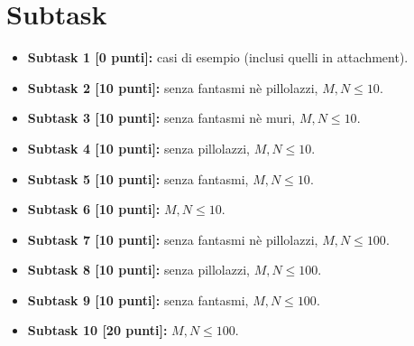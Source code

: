 \section*{Subtask}
\begin{itemize}
\item \textbf{Subtask 1 [0 punti]:} casi di esempio (inclusi quelli in attachment).
\item \textbf{Subtask 2 [10 punti]:} senza fantasmi nè pillolazzi, $M,N \le 10$.
\item \textbf{Subtask 3 [10 punti]:} senza fantasmi nè muri, $M,N \le 10$.
\item \textbf{Subtask 4 [10 punti]:} senza pillolazzi, $M,N \le 10$.
\item \textbf{Subtask 5 [10 punti]:} senza fantasmi, $M,N \le 10$.
\item \textbf{Subtask 6 [10 punti]:} $M,N \le 10$.
\item \textbf{Subtask 7 [10 punti]:} senza fantasmi nè pillolazzi, $M,N \le 100$.
\item \textbf{Subtask 8 [10 punti]:} senza pillolazzi, $M,N \le 100$.
\item \textbf{Subtask 9 [10 punti]:} senza fantasmi, $M,N \le 100$.
\item \textbf{Subtask 10 [20 punti]:} $M,N \le 100$.
\end{itemize}



